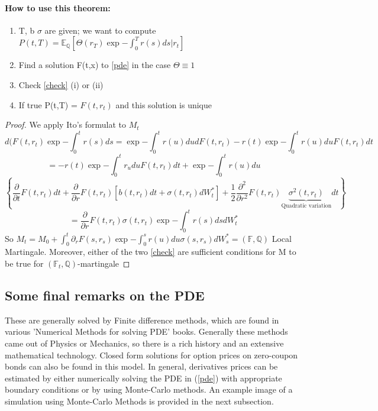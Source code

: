 \documentclass[10pt, oneside, reqno]{amsbook}
\theoremstyle{plain}%
\theoremstyle{definition}
\theoremstyle{rem}
\theoremstyle{definition}
\def\Qbb{\ensuremath{\mathbb{Q}}}
\newcommand{\F}{\mathbb{F}}
\numberwithin{equation}{chapter}
\begin{document}
\paragraph{How to use this theorem:}
\begin{enumerate}
 \item T, b $\sigma$ are given; we want to compute $P(t,T) = \mathbb{E}_{\Qbb} \left[\Theta(r_{T}) 
\exp{-\int_{0}^{T} r(s) ds} |r_{t}\right]$
\item Find a solution F(t,x) to \ref{pde} in the case $\Theta \equiv 1$
\item Check \ref{check} (i) or (ii)
\item If true P(t,T) = $F(t,r_{t})$ and this solution is unique
\end{enumerate}
\begin{proof}
We apply Ito's formulat to $M_t$
 \begin{equation*}
  d(F(t,r_{t})\exp{-\int_{0}^{t} r(s) ds} = \exp{-\int_{0}^{t} r(u) du} dF(t,r_{t}) 
- r(t) \exp{-\int_{0}^{t} r(u) du}F(t,r_{t})dt\end{equation*} \begin{equation*}
= -r(t)\exp{-\int_{0}^{t} r_{u} du}F(t,r_{t})dt + \exp{-\int_{0}^{t} r(u) du} \end{equation*}
\begin{equation*}
\left\lbrace\dfrac{\partial}{\partial t} F(t, r_{t}) dt + \dfrac{\partial}{\partial r} F(t, r_{t}) 
\left[b(t,r_{t})dt + \sigma (t,r_{t})dW^{*}_{t} \right]
+ \dfrac{1}{2} \dfrac{\partial^{2}}{\partial r^{2}}F(t,r_{t}) \underbrace{\sigma^{2}(t,r_{t})
 }_{\text{Quadratic variation}}dt\right\rbrace \end{equation*}
\begin{equation*}
= \dfrac{\partial}{\partial r} F(t, r_{t}) \sigma (t, r_{t}) \exp{-\int_{0}^{t} r(s) ds}dW_{t}^{*}
\end{equation*}
So $ M_t = M_0 + \int_{0}^{t} \partial_{r} F(s, r_s) \exp{-\int_{0}^{s} r(u) du} \sigma(s,r_{s})dW^*_s 
 = (\F, \Qbb)$ Local Martingale. Moreover, either of the two \ref{check} are sufficient conditions
for M to be true for $(\F_t, \Qbb)$-martingale
\end{proof}
\subsection{Some final remarks on the PDE}
These are generally solved by Finite difference methods, which are found in various 'Numerical Methods for solving PDE'
books. Generally these methods came out of Physics or Mechanics, so there is a rich history and an extensive mathematical
technology. 
Closed form solutions for option prices on zero-coupon bonds can also be found in this model. In general,
derivatives prices can be estimated by either numerically solving the PDE in (\ref{pde}) with appropriate boundary
conditions or by using Monte-Carlo methods.
An example image of a simulation using Monte-Carlo Methods is provided in the next subsection.
\end{document}
